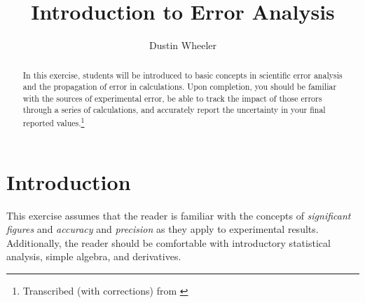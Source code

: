 \documentclass[nobib,nofonts,nols,nohyper]{tufte-handout}
\title{Introduction to Error Analysis}
\author{Dustin Wheeler}
\begin{document}
\maketitle

\begin{abstract}
	\noindent
	In this exercise, students will be introduced to basic concepts in scientific error analysis and the propagation of error in calculations. 
	Upon completion, you should be familiar with the sources of experimental error, be able to track the impact of those errors through a series of calculations, and accurately report the uncertainty in your final reported values.\thanks{Transcribed (with corrections) from \cite{AuthorA}} 
\end{abstract}

\section{Introduction} %
\label{sec:intro}

This exercise assumes that the reader is familiar with the concepts of \emph{significant figures} and \emph{accuracy} and \emph{precision} as they apply to experimental results. 
Additionally, the reader should be comfortable with introductory statistical analysis, simple algebra, and derivatives. 




\nocite{*}
\printbibliography[category=cited]%

\printbibliography[title={Further Reading},notcategory=cited]
\end{document}
